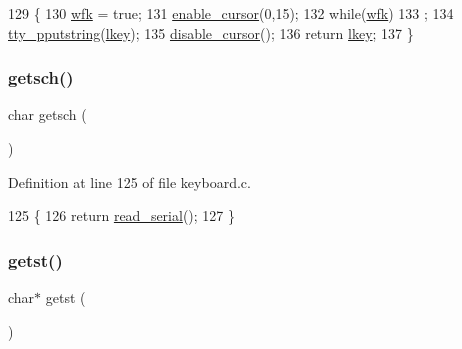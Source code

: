 \begin{DoxyCode}
129              \{
130     \hyperlink{a00038_a6ddd5223379778858edc46ffbec19775_a6ddd5223379778858edc46ffbec19775}{wfk} = \textcolor{keyword}{true};
131     \hyperlink{a00173_afe197dc4dbfa6036ef04abd2aeeeca2d_afe197dc4dbfa6036ef04abd2aeeeca2d}{enable\_cursor}(0,15);
132     \textcolor{keywordflow}{while}(\hyperlink{a00038_a6ddd5223379778858edc46ffbec19775_a6ddd5223379778858edc46ffbec19775}{wfk})
133         ;
134     \hyperlink{a00173_ade960b1320324706aac6c00cc6b1b2fe_ade960b1320324706aac6c00cc6b1b2fe}{tty\_pputstring}(\hyperlink{a00038_ade374650022cb30c4f5591a8dafad685_ade374650022cb30c4f5591a8dafad685}{lkey});
135     \hyperlink{a00173_a3d09038c7b6436e60b228f2f3f451f6a_a3d09038c7b6436e60b228f2f3f451f6a}{disable\_cursor}();
136     \textcolor{keywordflow}{return} \hyperlink{a00038_ade374650022cb30c4f5591a8dafad685_ade374650022cb30c4f5591a8dafad685}{lkey};
137 \}
\end{DoxyCode}
\mbox{\label{a00041_aa7ee03b27a489828ce588d0fc023cab3_aa7ee03b27a489828ce588d0fc023cab3}} 
\subsubsection{\texorpdfstring{getsch()}{getsch()}}
{\footnotesize\ttfamily char getsch (\begin{DoxyParamCaption}{ }\end{DoxyParamCaption})}



Definition at line 125 of file keyboard.\+c.


\begin{DoxyCode}
125               \{
126     \textcolor{keywordflow}{return} \hyperlink{a00056_ad343a7018f74662f794968dfa0523841_ad343a7018f74662f794968dfa0523841}{read\_serial}();
127 \}
\end{DoxyCode}
\mbox{\label{a00041_ab88a2e96bbe585e228a5b201435c0240_ab88a2e96bbe585e228a5b201435c0240}} 
\subsubsection{\texorpdfstring{getst()}{getst()}}
{\footnotesize\ttfamily char$\ast$ getst (\begin{DoxyParamCaption}{ }\end{DoxyParamCaption})}



